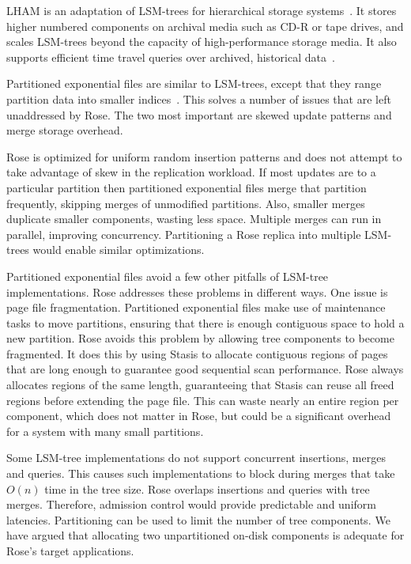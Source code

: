 \documentclass{vldb}
\newcommand{\rows}{Rose\xspace}
\newcommand{\rowss}{Rose's\xspace}
\begin{document}
LHAM is an adaptation of LSM-trees for hierarchical storage
systems~\cite{lham}.  It stores higher numbered
components on archival media such as CD-R or tape drives, and
scales LSM-trees beyond the capacity of high-performance storage
media.  It also supports efficient time travel queries over archived, historical
data~\cite{lham}.

Partitioned exponential files are similar to LSM-trees, except that
they range partition data into smaller indices~\cite{partexp}.  This solves a number
of issues that are left unaddressed by \rows.  The two most
important are skewed update patterns and merge storage
overhead.

\rows is optimized for uniform random insertion patterns
and does not attempt to take advantage of skew in the replication
workload.  If most updates are to a particular partition then
partitioned exponential files merge that partition frequently,
skipping merges of unmodified partitions.
Also, smaller merges duplicate smaller components, wasting less space.
Multiple merges can run in parallel, improving concurrency.
Partitioning a \rows
replica into multiple LSM-trees would enable similar optimizations.

Partitioned exponential files avoid a few other pitfalls of LSM-tree
implementations.  \rows addresses these problems in different ways.
One issue is page file fragmentation.  Partitioned exponential files
make use of maintenance tasks to move partitions, ensuring that there
is enough contiguous space to hold a new partition.  \rows avoids this
problem by allowing tree components to become fragmented.  It does
this by using Stasis to allocate contiguous regions of pages that
are long enough to guarantee good sequential scan performance.
\rows always allocates regions of the same length, guaranteeing that
Stasis can reuse all freed regions before extending the page file.
This can waste nearly an entire region per component, which does not
matter in \rows, but could be a significant overhead for a system with
many small partitions.

Some LSM-tree implementations do not support concurrent insertions,
merges and queries.  This causes such implementations to block during
merges that take $O(n)$ time in the tree size.
\rows overlaps insertions and queries with tree merges.  Therefore,
admission control would provide predictable and uniform latencies.
Partitioning can be used to limit the number of tree components.  We
have argued that allocating two unpartitioned on-disk components is adequate for
\rowss target applications.
\end{document}
